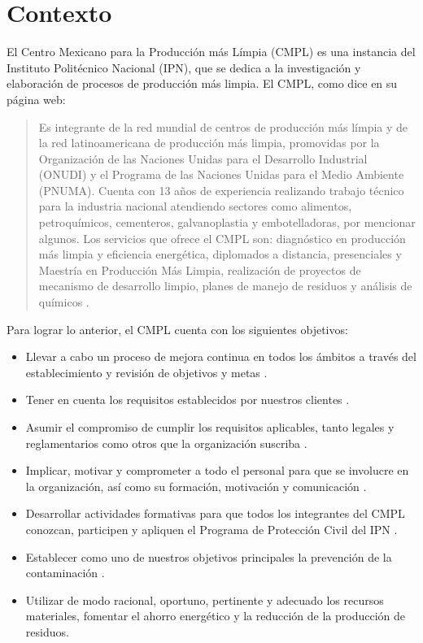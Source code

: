 \section{Contexto}

El Centro Mexicano para la Producción más Límpia (CMPL) es una instancia del Instituto Politécnico Nacional (IPN), que se dedica a la investigación y elaboración de procesos de producción más limpia. El CMPL, como dice en su página web:

	\begin{quotation}Es integrante de la red mundial de centros de producción más límpia y de la red latinoamericana de producción más limpia, promovidas por la Organización de las Naciones Unidas para el Desarrollo Industrial (ONUDI) y el Programa de las Naciones Unidas para el Medio Ambiente (PNUMA). Cuenta con 13 años de experiencia realizando trabajo técnico para la industria nacional atendiendo sectores como alimentos, petroquímicos, cementeros, galvanoplastia y embotelladoras, por mencionar algunos. Los servicios que ofrece el CMPL son: diagnóstico en producción más limpia y eficiencia energética, diplomados a distancia, presenciales y Maestría en Producción Más Limpia, realización de proyectos de mecanismo de desarrollo limpio, planes de manejo de residuos y análisis de químicos \cite{PoliticaCMPL}.\\
	\end{quotation}
	
Para lograr lo anterior, el CMPL cuenta con los siguientes objetivos:
	
	\begin{itemize}
		\item Llevar a cabo un proceso de mejora continua en todos los ámbitos a través del establecimiento y revisión de objetivos y metas \cite{PoliticaCMPL}.
		\item Tener en cuenta los requisitos establecidos por nuestros clientes \cite{PoliticaCMPL}.
		\item Asumir el compromiso de cumplir los requisitos aplicables, tanto legales y reglamentarios como otros que la organización suscriba \cite{PoliticaCMPL}.
		\item Implicar, motivar y comprometer a todo el personal para que se involucre en la organización, así como su formación, motivación y comunicación \cite{PoliticaCMPL}.
		\item Desarrollar actividades formativas para que todos los integrantes del CMPL conozcan, participen y apliquen el Programa de Protección Civil del IPN \cite{PoliticaCMPL}.
		\item Establecer como uno de nuestros objetivos principales la prevención de la contaminación \cite{PoliticaCMPL}.
		\item Utilizar de modo racional, oportuno, pertinente y adecuado los recursos materiales, fomentar el ahorro energético y la reducción de la producción de residuos\cite{PoliticaCMPL}. 
	\end{itemize}
	
